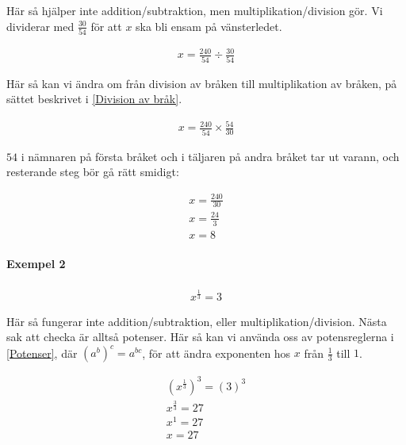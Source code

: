 Här så hjälper inte addition/subtraktion, men multiplikation/division gör. Vi dividerar med $\frac{30}{54}$ för att $x$ ska bli ensam på vänsterledet.

\begin{align}
	x = \frac{240}{54} \div \frac{30}{54}
\end{align}

Här så kan vi ändra om från division av bråken till multiplikation av bråken, på sättet beskrivet i \ref{Division av bråk}.

\begin{align}
	x = \frac{240}{54} \times \frac{54}{30}
\end{align}

$54$ i nämnaren på första bråket och i täljaren på andra bråket tar ut varann, och resterande steg bör gå rätt smidigt:

\begin{align}
	x = \frac{240}{30} \\
	x = \frac{24}{3} \\
	x = 8
\end{align}

\paragraph{Exempel 2}

\begin{align}
	x^{\frac{1}{3}} = 3
\end{align}

Här så fungerar inte addition/subtraktion, eller multiplikation/division. Nästa sak att checka är alltså potenser. Här så kan vi använda oss av potensreglerna i \ref{Potenser}, där $(a^b)^c = a^{bc}$, för att ändra exponenten hos $x$ från $\frac{1}{3}$ till $1$.

\begin{align}
	(x^{\frac{1}{3}})^{3} = (3)^3 \\
	x^{\frac{3}{3}} = 27 \\
	x^1 = 27 \\
	x = 27
\end{align}
























































